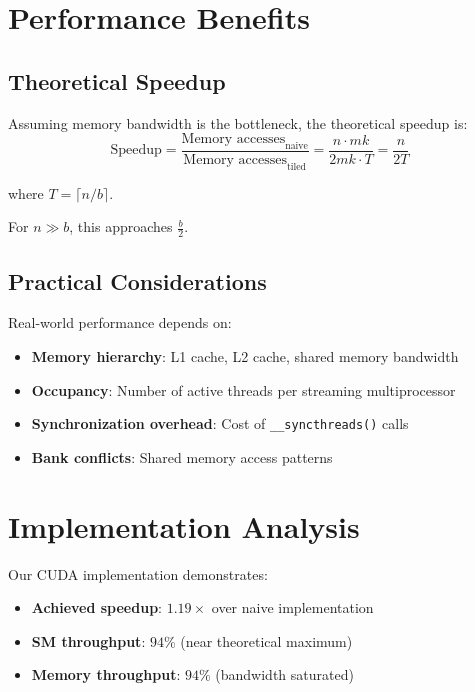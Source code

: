 \documentclass{amsbook}
\theoremstyle{definition}
\begin{document}
\section{Performance Benefits}

\subsection{Theoretical Speedup}

Assuming memory bandwidth is the bottleneck, the theoretical speedup is:
\begin{equation}
\text{Speedup} = \frac{\text{Memory accesses}_{\text{naive}}}{\text{Memory accesses}_{\text{tiled}}} = \frac{n \cdot mk}{2mk \cdot T} = \frac{n}{2T}
\end{equation}

where $T = \lceil n/b \rceil$.

For $n \gg b$, this approaches $\frac{b}{2}$.

\subsection{Practical Considerations}

Real-world performance depends on:
\begin{itemize}
\item \textbf{Memory hierarchy}: L1 cache, L2 cache, shared memory bandwidth
\item \textbf{Occupancy}: Number of active threads per streaming multiprocessor
\item \textbf{Synchronization overhead}: Cost of \texttt{\_\_syncthreads()} calls
\item \textbf{Bank conflicts}: Shared memory access patterns
\end{itemize}

\section{Implementation Analysis}

Our CUDA implementation demonstrates:
\begin{itemize}
\item \textbf{Achieved speedup}: $1.19\times$ over naive implementation
\item \textbf{SM throughput}: $94\%$ (near theoretical maximum)
\item \textbf{Memory throughput}: $94\%$ (bandwidth saturated)
\end{itemize}
\end{document}
